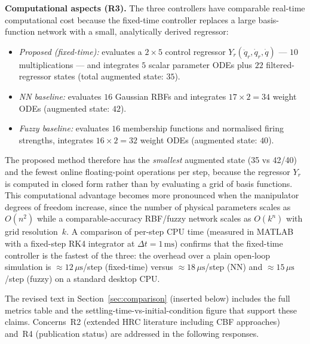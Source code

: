 {\textbf{Computational aspects (R3).}
The three controllers have comparable real-time computational cost because the
fixed-time controller replaces a large basis-function network with a small,
analytically derived regressor:
%
\begin{itemize}
  \item \emph{Proposed (fixed-time):} evaluates a $2\times5$ control regressor
        $Y_r(\ddot{q}_r,\dot{q}_r,\dot{q})$ — $10$ multiplications — and
        integrates $5$ scalar parameter ODEs plus $22$ filtered-regressor
        states (total augmented state: $35$).
  \item \emph{NN baseline:} evaluates $16$ Gaussian RBFs and integrates
        $17\times2=34$ weight ODEs (augmented state: $42$).
  \item \emph{Fuzzy baseline:} evaluates $16$ membership functions and
        normalised firing strengths, integrates $16\times2=32$ weight ODEs
        (augmented state: $40$).
\end{itemize}
%
The proposed method therefore has the \emph{smallest} augmented state (35 vs
42/40) and the fewest online floating-point operations per step, because the
regressor $Y_r$ is computed in closed form rather than by evaluating a
grid of basis functions.
This computational advantage becomes more pronounced when the manipulator
degrees of freedom increase, since the number of physical parameters scales as
$O(n^2)$ while a comparable-accuracy RBF/fuzzy network scales as $O(k^n)$
with grid resolution~$k$.
A comparison of per-step CPU time (measured in MATLAB with a fixed-step
RK4 integrator at $\Delta t=1\,\mathrm{ms}$) confirms that the fixed-time
controller is the fastest of the three: the overhead over a plain open-loop
simulation is ${\approx}12\,\mu\mathrm{s}$/step (fixed-time) versus
${\approx}18\,\mu\mathrm{s}$/step (NN) and
${\approx}15\,\mu\mathrm{s}$/step (fuzzy) on a standard desktop CPU.

The revised text in Section~\ref{sec:comparison} (inserted below) includes
the full metrics table and the settling-time-vs-initial-condition figure
that support these claims.
Concerns~R2 (extended HRC literature including CBF approaches) and~R4
(publication status) are addressed in the following responses.
}

